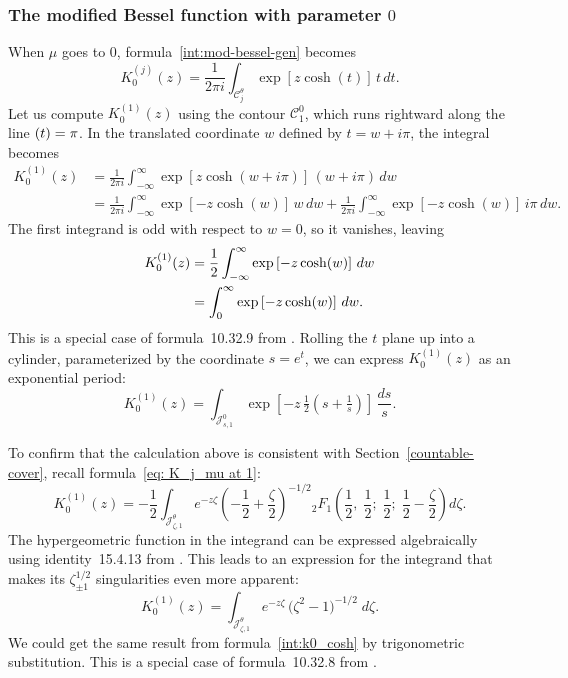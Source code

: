 \documentclass{article}
\let\Im\relax
\DeclareMathOperator{\Im}{Im}
\theoremstyle{definition}
\theoremstyle{plain}
\begin{document}
\subsubsection{The modified Bessel function with parameter $0$}
When $\mu$ goes to $0$, formula~\eqref{int:mod-bessel-gen} becomes
\[ K_0^{(j)}(z) = \frac{1}{2\pi i} \int_{\mathcal{C}_j^\theta} \exp\left[z \cosh(t)\right]\,t\,dt. \]
Let us compute $K^{(1)}_{0}(z)$ using the contour $\mathcal{C}_1^0$, which runs rightward along the line $\Im(t) = \pi$. In the translated coordinate $w$ defined by $t = w + i\pi$, the integral becomes
\begin{align*}
K_0^{(1)}(z) & = \frac{1}{2\pi i} \int_{-\infty}^\infty \exp\left[z \cosh(w + i\pi)\right]\,(w + i\pi)\,dw \\
& = \frac{1}{2\pi i} \int_{-\infty}^\infty \exp\left[-z \cosh(w)\right]\,w\,dw + \frac{1}{2\pi i} \int_{-\infty}^\infty \exp\left[-z \cosh(w)\right]\,i\pi\,dw.
\end{align*}
The first integrand is odd with respect to $w = 0$, so it vanishes, leaving
\begin{align}
K_0^{(1)}(z) & = \frac{1}{2} \int_{-\infty}^\infty \exp\left[-z \cosh(w)\right]\,dw \notag \\
& = \int_0^\infty \exp\left[-z \cosh(w)\right]\,dw. \label{int:k0_cosh}
\end{align}
This is a special case of formula~10.32.9 from \cite{dlmf}. Rolling the $t$ plane up into a cylinder, parameterized by the coordinate $s = e^t$, we can express $K_0^{(1)}(z)$ as an exponential period:
\[ K_0^{(1)}(z) = \int_{\mathcal{J}^0_{s, 1}} \exp\left[-z\,\tfrac{1}{2}\left(s + \tfrac{1}{s}\right)\right]\,\frac{ds}{s}. \]

To confirm that the calculation above is consistent with Section~\ref{countable-cover}, recall formula~\eqref{eq: K_j_mu at 1}:
\[ K_0^{(1)}(z) = -\frac{1}{2} \int_{\mathcal{J}^\theta_{\zeta, 1}} e^{-z\zeta} \left(-\frac{1}{2}+\frac{\zeta}{2}\right)^{-1/2} {}_2F_1\left(\frac{1}{2},\;\frac{1}{2};\;\frac{1}{2};\;\frac{1}{2} - \frac{\zeta}{2}\right) d\zeta. \]
The hypergeometric function in the integrand can be expressed algebraically using identity~15.4.13 from \cite{dlmf}. This leads to an expression for the integrand that makes its $\zeta_{\pm 1}^{1/2}$ singularities even more apparent:
\begin{equation}\label{eqn:borel_bessel0}
K_0^{(1)}(z) = \int_{\mathcal{J}^\theta_{\zeta, 1}} e^{-z\zeta}\,\big(\zeta^2 - 1\big)^{-1/2}\;d\zeta.
\end{equation}
We could get the same result from formula~\eqref{int:k0_cosh} by trigonometric substitution. This is a special case of formula~10.32.8 from \cite{dlmf}.
%
\end{document}

